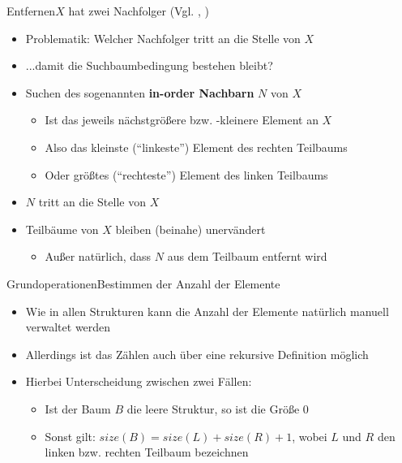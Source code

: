 \begin{frame}{Entfernen}{$X$ hat zwei Nachfolger (Vgl. \cite{tree1}, \cite{tree2})}
	\begin{itemize}
		\item Problematik: Welcher Nachfolger tritt an die Stelle von $X$
		\item ...damit die Suchbaumbedingung bestehen bleibt?
		\item Suchen des sogenannten \textbf{in-order Nachbarn} $N$ von $X$
		\begin{itemize}
			\item Ist das jeweils nächstgrößere bzw. -kleinere Element an $X$
			\item Also das kleinste ("`linkeste"') Element des rechten Teilbaums
			\item Oder größtes ("`rechteste"') Element des linken Teilbaums
		\end{itemize}
		\item $N$ tritt an die Stelle von $X$
		\item Teilbäume von $X$ bleiben (beinahe) unervändert
		\begin{itemize}
			\item Außer natürlich, dass $N$ aus dem Teilbaum entfernt wird
		\end{itemize}
	\end{itemize}
\end{frame}

\begin{frame}{Grundoperationen}{Bestimmen der Anzahl der Elemente}
	\begin{itemize}
		\item Wie in allen Strukturen kann die Anzahl der Elemente natürlich manuell verwaltet werden
		\item Allerdings ist das Zählen auch über eine rekursive Definition möglich
		\item Hierbei Unterscheidung zwischen zwei Fällen:
		\begin{itemize}
			\item Ist der Baum $B$ die leere Struktur, so ist die Größe $0$
			\item Sonst gilt: $size(B)=size(L)+size(R)+1$, wobei $L$ und $R$ den linken bzw. rechten Teilbaum bezeichnen
		\end{itemize}
	\end{itemize}
\end{frame}


